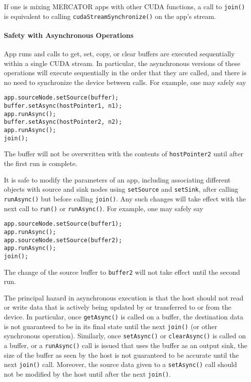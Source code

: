 \documentclass[11pt]{article}
\begin{document}
If one is mixing MERCATOR apps with other CUDA functions, a call to
\texttt{join()} is equivalent to calling
\texttt{cudaStreamSynchronize()} on the app's stream.

\paragraph*{Safety with Asynchronous Operations}

App runs and calls to get, set, copy, or clear buffers are executed
sequentially within a single CUDA stream.  In particular, the
asynchronous versions of these operations will execute sequentially in
the order that they are called, and there is no need to synchronize
the device between calls.  For example, one may safely say
\begin{verbatim}
app.sourceNode.setSource(buffer);
buffer.setAsync(hostPointer1, n1);
app.runAsync();
buffer.setAsync(hostPointer2, n2);
app.runAsync();
join();
\end{verbatim}
The buffer will not be overwritten with the contents of
\texttt{hostPointer2} until after the first run is complete.

It is safe to modify the parameters of an app, including associating
different objects with source and sink nodes using \texttt{setSource}
and \texttt{setSink}, after calling \texttt{runAsync()} but before
calling \texttt{join()}.  Any such changes will take effect with the
next call to \texttt{run()} or \texttt{runAsync()}.  For example,
one may safely say
\begin{verbatim}
app.sourceNode.setSource(buffer1);
app.runAsync();
app.sourceNode.setSource(buffer2);
app.runAsync();
join();
\end{verbatim}
The change of the source buffer to \texttt{buffer2} will not take
effect until the second run.

The principal hazard in asynchronous execution is that the host should
not read or write data that is actively being updated by or
transferred to or from the device.  In particular, once
\texttt{getAsync()} is called on a buffer, the destination data is not
guaranteed to be in its final state until the next \texttt{join()} (or
other synchronous operation).  Similarly, once \texttt{setAsync()} or
\texttt{clearAsync()} is called on a buffer, or a \texttt{runAsync()}
call is issued that uses the buffer as an output sink, the size of the
buffer as seen by the host is not guaranteed to be accurate until the
next \texttt{join()} call.  Moreover, the source data given to a
\texttt{setAsync()} call should not be modified by the host until
after the next \texttt{join()}.
\end{document}
